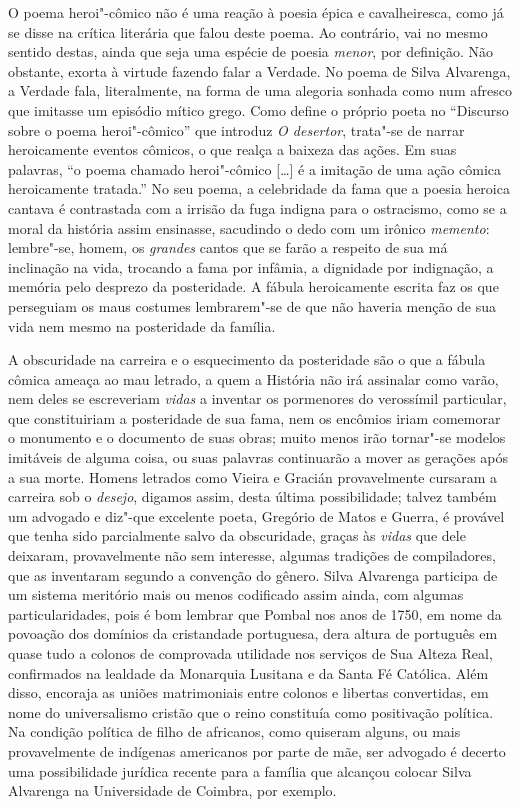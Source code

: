 O poema heroi"-cômico não é uma reação à poesia épica e cavalheiresca, como já se
disse na crítica literária que falou deste poema. Ao contrário, vai no mesmo
sentido destas, ainda que seja uma espécie de poesia \textit{menor}, por
definição.  Não obstante, exorta à virtude fazendo falar a Verdade. No poema de
Silva Alvarenga, a Verdade fala, literalmente, na forma de uma alegoria sonhada
como num afresco que imitasse um episódio mítico grego. Como define o próprio
poeta no ``Discurso sobre o poema heroi"-cômico'' que introduz \textit{O
desertor}, trata"-se de narrar heroicamente eventos cômicos, o que realça a
baixeza das ações. Em suas palavras, ``o poema chamado heroi"-cômico [\ldots{}] é a
imitação de uma ação cômica heroicamente tratada.'' No seu poema, a celebridade
da fama que a poesia heroica cantava é contrastada com a irrisão da fuga indigna
para o ostracismo, como se a moral da história assim ensinasse, sacudindo o dedo
com um irônico \textit{memento}: lembre"-se, homem, os \textit{grandes} cantos
que se farão a respeito de sua má inclinação na vida, trocando a fama por
infâmia, a dignidade por indignação, a memória pelo desprezo da posteridade. A
fábula  heroicamente escrita faz os que perseguiam os maus costumes lembrarem"-se
de que não haveria menção de sua vida nem mesmo na posteridade da família. 

A obscuridade na carreira e o esquecimento da posteridade são o que a fábula
cômica ameaça ao mau letrado, a quem a História não irá assinalar como varão,
nem deles se escreveriam \textit{vidas} a inventar os pormenores do verossímil
particular, que constituiriam a posteridade de sua fama, nem os encômios iriam
comemorar o monumento e o documento de suas obras; muito menos irão tornar"-se
modelos imitáveis de alguma coisa, ou suas palavras continuarão a mover as
gerações após a sua morte. Homens letrados como Vieira e Gracián provavelmente
cursaram a carreira sob o \textit{desejo}, digamos assim, desta última
possibilidade; talvez também um advogado e diz"-que excelente poeta, Gregório de
Matos e Guerra, é provável que tenha sido parcialmente salvo da obscuridade,
graças às \textit{vidas} que dele deixaram, provavelmente não sem interesse,
algumas tradições de compiladores, que as inventaram segundo a convenção do
gênero.  Silva Alvarenga participa de um sistema meritório mais ou menos
codificado assim ainda, com algumas particularidades, pois é bom lembrar que
Pombal nos anos de 1750, em nome da povoação dos domínios da cristandade		\EP
portuguesa, dera altura de português em quase tudo a colonos de comprovada
utilidade nos serviços de Sua Alteza Real, confirmados na lealdade da Monarquia
Lusitana e da Santa Fé Católica. Além disso, encoraja as uniões matrimoniais
entre colonos e libertas convertidas, em nome do universalismo cristão que o
reino constituía como positivação política.  Na condição política de filho de
africanos, como quiseram alguns, ou mais provavelmente de indígenas americanos
por parte de mãe, ser advogado é decerto uma possibilidade jurídica recente para
a família que alcançou colocar Silva Alvarenga na Universidade de Coimbra, por
exemplo.

